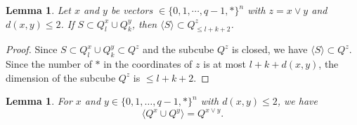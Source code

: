 \documentclass[reqno,11pt]{amsart}
\newtheorem{lemma}[theorem]{Lemma}
\renewcommand{\leq}{\leqslant}
\begin{document}
\begin{lemma} \label{lemma:S}
Let $x$ and $y $ be vectors $\in \{0,1,\cdots,q-1,*\}^n$ with $z=x \vee y$ and $d(x,y) \leq 2$. If $S \subset Q_{l}^x \cup Q_k^y$, then $\langle S \rangle \subset Q_{\leq l+k+2}^z$. 
\end{lemma}
\begin{proof}
Since $S \subset Q_{l}^x \cup Q_k^y \subset Q^{z}$ and the subcube $Q^z$ is closed, we have $\langle S \rangle \subset Q^z$. Since the number of $*$ in the coordinates of $z$ is at most $l+k+d(x,y)$, the dimension of the subcube $Q^z$ is $\leq l+k+2$.
\end{proof}



\begin{lemma} \label{lemma:Q^x Q^y}
For $x$ and $y \in \{0,1,\dots,q-1,*\}^n$ with $d(x,y) \leq 2$, we have 
$$\langle Q^x \cup Q^y \rangle = Q^{x \vee y}.$$
\end{lemma}
\end{document}
